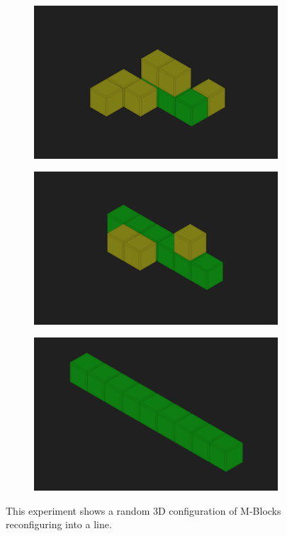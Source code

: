 \begin{figure}[h]  
	\centering
	\begin{subfigure}[b]{0.3\linewidth}
		\includegraphics[width=0.9\linewidth]{figures/line_1.png}
		\subcaption{} 
	\end{subfigure}
	\begin{subfigure}[b]{0.3\linewidth}
		\includegraphics[width=0.9\linewidth]{figures/line_2.png}
		\subcaption{} 
	\end{subfigure}
	\begin{subfigure}[b]{0.3\linewidth}
		\includegraphics[width=0.9\linewidth]{figures/line_3.png}
		\subcaption{} 
	\end{subfigure}
	
	\caption{This experiment shows a random 3D configuration of M-Blocks reconfiguring into a line.}
	
	\label{fig:line}
\end{figure}

